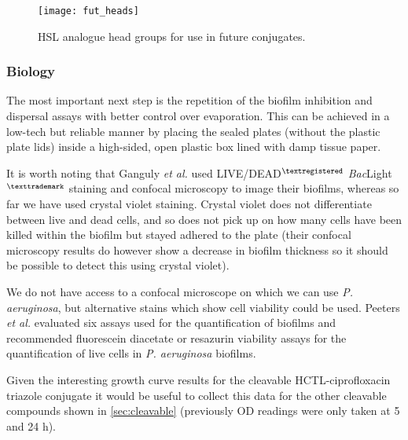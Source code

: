 \begin{figure}[H]
	\begin{center}
		\texttt{[image: fut\_heads]}
		\caption{HSL analogue head groups for use in future conjugates.
		\label{fgr:fut_heads}}
	\end{center}
\end{figure}

\subsubsection{Biology}

The most important next step is the repetition of the biofilm inhibition and dispersal assays with better control over evaporation. 
This can be achieved in a low-tech but reliable manner by placing the sealed plates (without the plastic plate lids) inside a high-sided, open plastic box lined with damp tissue paper.

It is worth noting that Ganguly \textit{et al.} used LIVE/DEAD$^{\tiny{\textregistered}}$ \textit{Bac}Light$^{\tiny{\texttrademark}}$ staining and confocal microscopy to image their biofilms, whereas so far we have used crystal violet staining. Crystal violet does not differentiate between live and dead cells, and so does not pick up on how many cells have been killed within the biofilm but stayed adhered to the plate (their confocal microscopy results do however show a decrease in biofilm thickness so it should be possible to detect this using crystal violet).

We do not have access to a confocal microscope on which we can use \textit{P. aeruginosa}, but alternative stains which show cell viability could be used. Peeters \textit{et al.}\cite{Peeters2008} evaluated six assays used for the quantification of biofilms and recommended fluorescein diacetate or resazurin viability assays for the quantification of live cells in \textit{P. aeruginosa} biofilms.

Given the interesting growth curve results for the cleavable HCTL-ciprofloxacin triazole conjugate  it would be useful to collect this data for the other cleavable compounds shown in \ref{sec:cleavable} (previously OD readings were only taken at 5 and 24 h). 